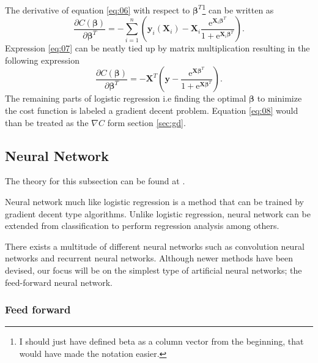 \documentclass[uio,jmp,amsmath,amssymb,reprint,nofootinbib]{revtex4-1}
\numberwithin{equation}{section}
\newcommand{\e}{\mathrm{e}}
\newcommand{\lp}{\left(}
\newcommand{\rp}{\right)}
\begin{document}
The derivative of equation \ref{eq:06} with respect to \(\bm{\beta}^T\)\footnote{I should just have defined beta as a column vector from the beginning, that would have made the notation easier.} can be written as
\begin{equation}\label{eq:07}
\frac{\partial C(\bm{\beta})}{\partial \bm{\beta}^T} = -\sum_{i=1}^n \lp \bm{y}_i\lp \bm{X}_i\rp - \bm{X}_i\frac{\e^{\bm{X}_i\bm{\beta}^T}}{1 + \e^{\bm{X}_i\bm{\beta}^T}}\rp.
\end{equation}
Expression \ref{eq:07} can be neatly tied up by matrix multiplication resulting in the following expression
\begin{equation}\label{eq:08}
\frac{\partial C(\bm{\beta})}{\partial \bm{\beta}^T} = -\bm{X}^T\lp \bm{y} - \frac{\e^{\bm{X}\bm{\beta}^T}}{1 + \e^{\bm{X}\bm{\beta}^T}}\rp.
\end{equation}
The remaining parts of logistic regression i.e finding the optimal \(\bm{\beta}\) to minimize the cost function is labeled a gradient decent problem. Equation \ref{eq:08} would than be treated as the \(\nabla C\) form section \ref{sec:gd}.

\subsection{Neural Network}

The theory for this subsection can be found at \cite{MHJ_NN}.

Neural network much like logistic regression is a method that can be trained by gradient decent type algorithms. Unlike logistic regression, neural network can be extended from classification to perform regression analysis among others.

There exists a multitude of different neural networks such as convolution neural networks and recurrent neural networks. Although newer methods have been devised, our focus will be on the simplest type of artificial neural networks; the feed-forward neural network.

\subsubsection{Feed forward}
\end{document}
